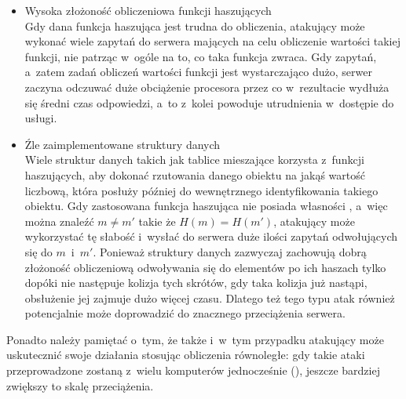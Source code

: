\begin{itemize}

    \item Wysoka złożoność obliczeniowa funkcji haszujących \\
    Gdy dana funkcja haszująca jest trudna do obliczenia, atakujący może
    wykonać wiele zapytań do serwera mających na celu obliczenie wartości
    takiej funkcji, nie patrząc w~ogóle na to, co taka funkcja zwraca. Gdy
    zapytań, a~zatem zadań obliczeń wartości funkcji jest wystarczająco dużo,
    serwer zaczyna odczuwać duże obciążenie procesora przez co w~rezultacie
    wydłuża się średni czas odpowiedzi, a~to z~kolei powoduje utrudnienia
    w~dostępie do usługi.

    \item Źle zaimplementowane struktury danych \\
    Wiele struktur danych takich jak tablice mieszające korzysta z~funkcji
    haszujących, aby dokonać rzutowania danego obiektu na jakąś wartość
    liczbową, która posłuży później do wewnętrznego identyfikowania takiego
    obiektu. Gdy zastosowana funkcja haszująca nie posiada własności
    , a~więc można znaleźć $m \neq m'$ takie że $H(m)
    = H(m')$, atakujący może wykorzystać tę słabość i~wysłać do serwera duże
    ilości zapytań odwołujących się do $m$~i~$m'$. Ponieważ struktury danych
    zazwyczaj zachowują dobrą złożoność obliczeniową odwoływania się do
    elementów po ich haszach tylko dopóki nie następuje kolizja tych skrótów,
    gdy taka kolizja już nastąpi, obsłużenie jej zajmuje dużo więcej czasu.
    Dlatego też tego typu atak również potencjalnie może doprowadzić do
    znacznego przeciążenia serwera.

\end{itemize}

Ponadto należy pamiętać o~tym, że także i~w~tym przypadku atakujący może
uskutecznić swoje działania stosując obliczenia równoległe: gdy takie ataki
przeprowadzone zostaną z~wielu komputerów jednocześnie (), jeszcze bardziej zwiększy to skalę przeciążenia.
